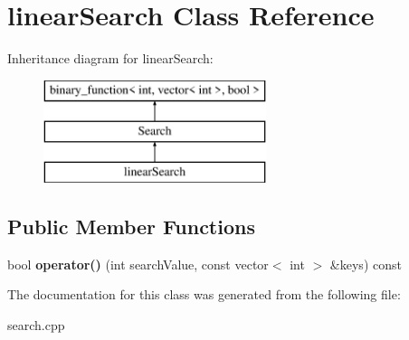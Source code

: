 \hypertarget{classlinear_search}{\section{linear\+Search Class Reference}
\label{classlinear_search}
}
Inheritance diagram for linear\+Search\+:\begin{figure}[H]
\begin{center}
\leavevmode
\includegraphics[height=3.000000cm]{classlinear_search}
\end{center}
\end{figure}
\subsection*{Public Member Functions}
\begin{DoxyCompactItemize}
\item 
\hypertarget{classlinear_search_a447bc4f724457f1786dc36c10626bfa8}{bool {\bfseries operator()} (int search\+Value, const vector$<$ int $>$ \&keys) const }\label{classlinear_search_a447bc4f724457f1786dc36c10626bfa8}

\end{DoxyCompactItemize}


The documentation for this class was generated from the following file\+:\begin{DoxyCompactItemize}
\item 
search.\+cpp\end{DoxyCompactItemize}

